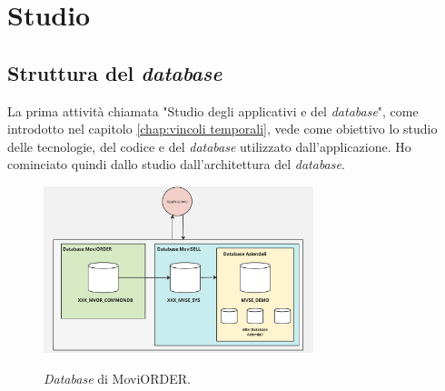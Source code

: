 \section{Studio}
\subsection{Struttura del \textit{database}}
La prima attività chiamata "Studio degli applicativi e del \textit{database}", come introdotto nel capitolo \ref{chap:vincoli temporali}, 
vede come obiettivo lo studio delle tecnologie, del codice e del \textit{database} utilizzato dall'applicazione. Ho cominciato quindi 
dallo studio dall'architettura del \textit{database}.\\

\begin{figure}[H]
    \centering
    \includegraphics[alt={\textit{Database} di MoviORDER}, width=0.7\textwidth]{img/database.png}
    \caption {\textit{Database} di MoviORDER.}
    \label{fig:database}
\end{figure}

